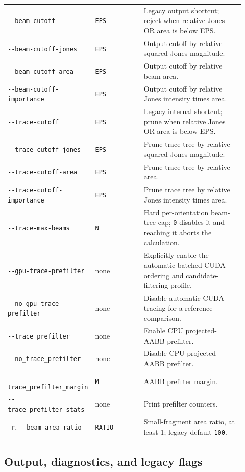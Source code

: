 \documentclass[
  10pt,
  a4paper,
]{article}
\begin{document}
\begin{longtable}[]{@{}L{0.24\linewidth}L{0.22\linewidth}L{0.46\linewidth}@{}}
\texttt{-\/-beam-cutoff} & \texttt{EPS} & Legacy output shortcut; reject
when relative Jones OR area is below EPS. \\
\texttt{-\/-beam-cutoff-jones} & \texttt{EPS} & Output cutoff by relative
squared Jones magnitude. \\
\texttt{-\/-beam-cutoff-area} & \texttt{EPS} & Output cutoff by relative
beam area. \\
\texttt{-\/-beam-cutoff-importance} & \texttt{EPS} & Output cutoff by
relative Jones intensity times area. \\
\texttt{-\/-trace-cutoff} & \texttt{EPS} & Legacy internal shortcut;
prune when relative Jones OR area is below EPS. \\
\texttt{-\/-trace-cutoff-jones} & \texttt{EPS} & Prune trace tree by
relative squared Jones magnitude. \\
\texttt{-\/-trace-cutoff-area} & \texttt{EPS} & Prune trace tree by
relative area. \\
\texttt{-\/-trace-cutoff-importance} & \texttt{EPS} & Prune trace tree
by relative Jones intensity times area. \\
\texttt{-\/-trace-max-beams} & \texttt{N} & Hard per-orientation beam-tree
cap; \texttt{0} disables it and reaching it aborts the calculation. \\
\nolinkurl{--gpu-trace-prefilter} & none & Explicitly enable the automatic
batched CUDA ordering and candidate-filtering profile. \\
\nolinkurl{--no-gpu-trace-prefilter} & none & Disable automatic CUDA tracing
for a reference comparison. \\
\texttt{-\/-trace\_prefilter} & none & Enable CPU projected-AABB
prefilter. \\
\texttt{-\/-no\_trace\_prefilter} & none & Disable CPU projected-AABB
prefilter. \\
\nolinkurl{--trace_prefilter_margin} & \texttt{M} & AABB prefilter
margin. \\
\texttt{-\/-trace\_prefilter\_stats} & none & Print prefilter
counters. \\
\texttt{-r}, \texttt{-\/-beam-area-ratio} & \texttt{RATIO} & Small-fragment
area ratio, at least 1; legacy default \texttt{100}. \\
\end{longtable}

\subsection{Output, diagnostics, and legacy
flags}\label{output-diagnostics-and-legacy-flags}
\end{document}
